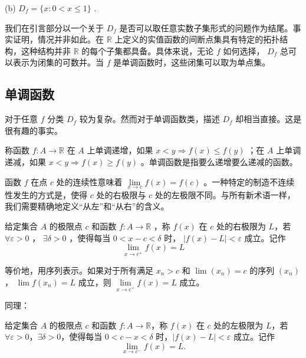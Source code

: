 (b) \({D}_{f} = \{ x : 0 < x \leq  1\}\) .

我们在引言部分以一个关于 \({D}_{f}\) 是否可以取任意实数子集形式的问题作为结尾。事实证明，情况并非如此。在 \(\mathbb{R}\) 上定义的实值函数的间断点集具有特定的拓扑结构，这种结构并非 \(\mathbb{R}\) 的每个子集都具备。具体来说，无论 \(f\) 如何选择， \({D}_{f}\) 总可以表示为闭集的可数并。当 \(f\) 是单调函数时，这些闭集可以取为单点集。

\subsection{单调函数}

对于任意 \(f\) 分类 \({D}_{f}\) 较为复杂。然而对于单调函数类，描述 \({D}_{f}\) 却相当直接。这是很有趣的事实。


\begin{Def}
  \label{def:4.6.1}
  称函数 \(f : A \rightarrow  \mathbb{R}\) 在 \(A\) 上单调递增，如果 \(x < y\Rightarrow f\left( x\right)  \leq  f\left( y\right)\) ；在 \(A\) 上单调递减，如果 \(x < y\Rightarrow f\left( x\right)  \geq  f\left( y\right)\) 。单调函数是指要么递增要么递减的函数。
\end{Def}


函数 \(f\) 在点 \(c\) 处的连续性意味着 \(\mathop{\lim }\limits_{{x \rightarrow  c}}f\left( x\right)  = f\left( c\right)\) 。一种特定的制造不连续性发生的方式是，使得 \(c\) 处的右极限与 \(c\) 处的左极限不同。与所有新术语一样，我们需要精确地定义“从左”和“从右”的含义。

\begin{Def}
  \label{def:4.6.2}
  给定集合 \(A\) 的极限点 \(c\) 和函数 \(f : A \rightarrow  \mathbb{R}\) ，称 $f(x)$ 在 $c$ 处的右极限为 $L$，若 \(\forall \varepsilon  > 0\) ， \(\exists \delta  > 0\) ，使得每当 \(0 < x - c < \delta\) 时， \(\left| {f\left( x\right)  - L}\right|  < \varepsilon\) 成立。记作
\[
\mathop{\lim }\limits_{{x \rightarrow  {c}^{ + }}}f\left( x\right)  = L
\]
\end{Def}


等价地，用序列表示。如果对于所有满足 \({x}_{n} > c\) 和 \(\lim \left( {x}_{n}\right)  = c\) 的序列 \(\left( {x}_{n}\right)\) ， \(\lim f\left( {x}_{n}\right)  = L\) 成立，则 \(\mathop{\lim }\limits_{{x \rightarrow  {c}^{ + }}}f\left( x\right)  = L\) 成立。


同理：
\addtocounter{Thm}{-1}
\begin{Def}
  给定集合 \(A\) 的极限点 \(c\) 和函数 \(f : A \rightarrow \mathbb{R}\)，称 \(f(x)\) 在 \(c\) 处的左极限为 \(L\)，若 \(\forall \varepsilon > 0\)，\(\exists \delta > 0\)，使得每当 \(0 < c - x < \delta\) 时，\(\left| f(x) - L \right| < \varepsilon\) 成立。记作  
\[
\mathop{\lim }\limits_{{x \rightarrow {c}^{-}}} f(x) = L.
\]
\end{Def}



